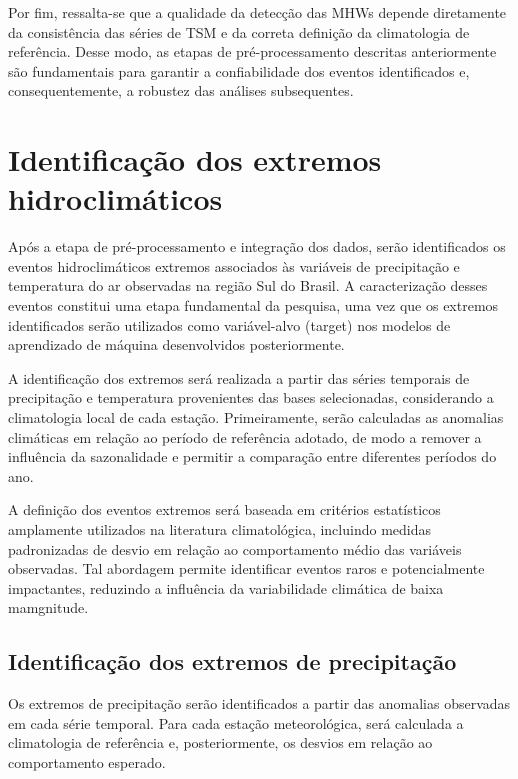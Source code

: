 	Por fim, ressalta-se que a qualidade da detecção das MHWs depende diretamente da consistência das séries de TSM e da correta definição da climatologia de referência.
	Desse modo, as etapas de pré-processamento descritas anteriormente são fundamentais para garantir a confiabilidade dos eventos identificados e, consequentemente, a robustez das análises subsequentes.

\section{Identificação dos extremos hidroclimáticos}\label{sec:identificacao-extremos-hidroclimaticos}

	Após a etapa de pré-processamento e integração dos dados, serão identificados os eventos hidroclimáticos extremos associados às variáveis de precipitação e temperatura do ar observadas na região Sul do Brasil.
	A caracterização desses eventos constitui uma etapa fundamental da pesquisa, uma vez que os extremos identificados serão utilizados como variável-alvo (target) nos modelos de aprendizado de máquina desenvolvidos posteriormente.

	A identificação dos extremos será realizada a partir das séries temporais de precipitação e temperatura provenientes das bases selecionadas, considerando a climatologia local de cada estação.
	Primeiramente, serão calculadas as anomalias climáticas em relação ao período de referência adotado, de modo a remover a influência da sazonalidade e permitir a comparação entre diferentes períodos do ano.

	A definição dos eventos extremos será baseada em critérios estatísticos amplamente utilizados na literatura climatológica, incluindo medidas padronizadas de desvio em relação ao comportamento médio das variáveis observadas.
	Tal abordagem permite identificar eventos raros e potencialmente impactantes, reduzindo a influência da variabilidade climática de baixa mamgnitude.

\subsection{Identificação dos extremos de precipitação}\label{sec:identificacao-extremos-precipitacao}

	Os extremos de precipitação serão identificados a partir das anomalias observadas em cada série temporal.
	Para cada estação meteorológica, será calculada a climatologia de referência e, posteriormente, os desvios em relação ao comportamento esperado.


